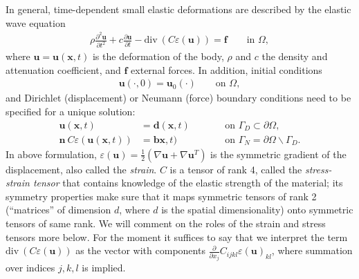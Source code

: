 \documentclass{article}
\renewcommand{\vec}[1]{\mathbf{#1}}
\renewcommand{\div}{\mathrm{div}\ }
\begin{document}
In general, time-dependent small elastic deformations are described by the
elastic wave equation
\begin{gather}
  \rho \frac{\partial^2 \vec u}{\partial t^2} 
  + c \frac{\partial \vec u}{\partial t}
  - \div ( C \varepsilon(\vec u)) = \vec f
  \qquad
  \text{in $\Omega$},
\end{gather}
where $\vec u=\vec u (\vec x,t)$ is the deformation of the body, $\rho$
and $c$ the density and attenuation coefficient, and $\vec f$ external forces.
In addition, initial conditions
\begin{align}
  \vec u(\cdot, 0) = \vec u_0(\cdot)
  \qquad
  \text{on $\Omega$},
\end{align}
and Dirichlet (displacement) or Neumann (force) boundary conditions need
to be specified for a unique solution:
\begin{align}
  \vec u(\vec x,t) &= \vec d(\vec x,t)
  \qquad
  &&\text{on $\Gamma_D\subset\partial\Omega$},  
  \\
  \vec n \ C \varepsilon(\vec u(\vec x,t)) &= \vec b\vec x,t)
  \qquad
  &&\text{on $\Gamma_N=\partial\Omega\backslash\Gamma_D$}.
\end{align}
In above formulation, $\varepsilon(\vec u)= \tfrac 12 (\nabla \vec u + \nabla
\vec u^T)$ is the symmetric gradient of the displacement, also called the
\textit{strain}. $C$ is a tensor of rank 4, called the \textit{stress-strain
  tensor} that contains knowledge of the elastic strength of the material; its
symmetry properties make sure that it maps symmetric tensors of rank 2
(``matrices'' of dimension $d$, where $d$ is the spatial dimensionality) onto
symmetric tensors of same rank. We will comment on the roles of the strain and
stress tensors more below. For the moment it suffices to say that we interpret
the term $\div ( C \varepsilon(\vec u))$ as the vector with components $\tfrac
\partial{\partial x_j} C_{ijkl} \varepsilon(\vec u)_{kl}$, where summation
over indices $j,k,l$ is implied.
\end{document}
